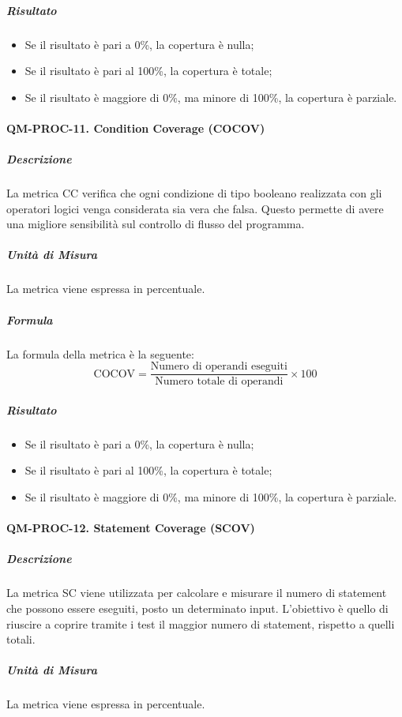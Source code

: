 			\subparagraph{Risultato}
			\begin{itemize}
				\item Se il risultato è pari a 0\%, la copertura è nulla;
				\item Se il risultato è pari al 100\%, la copertura è totale;
				\item Se il risultato è maggiore di 0\%, ma minore di 100\%, la copertura è parziale.
			\end{itemize}

		\paragraph{QM-PROC-11. Condition Coverage (COCOV)}

			\subparagraph{Descrizione}
			La metrica CC verifica che ogni condizione di tipo booleano realizzata con gli operatori logici venga considerata sia vera che falsa. Questo permette di avere una migliore sensibilità sul controllo di flusso del programma.

			\subparagraph{Unità di Misura}
			La metrica viene espressa in percentuale.

			\subparagraph{Formula}
			La formula della metrica è la seguente:
			\[
				\text{COCOV} = \frac{\text{Numero di operandi eseguiti}}{\text{Numero totale di operandi}} \times 100
			\]

			\subparagraph{Risultato}
			\begin{itemize}
				\item Se il risultato è pari a 0\%, la copertura è nulla;
				\item Se il risultato è pari al 100\%, la copertura è totale;
				\item Se il risultato è maggiore di 0\%, ma minore di 100\%, la copertura è parziale.
			\end{itemize}

		\paragraph{QM-PROC-12. Statement Coverage (SCOV)}

			\subparagraph{Descrizione}
			La metrica SC viene utilizzata per calcolare e misurare il numero di statement che possono essere eseguiti, posto un determinato input. L'obiettivo è quello di riuscire a coprire tramite i test il maggior numero di statement, rispetto a quelli totali.

			\subparagraph{Unità di Misura}
			La metrica viene espressa in percentuale.

